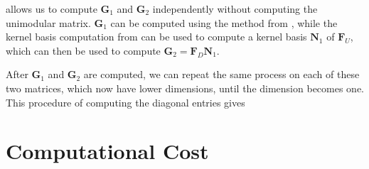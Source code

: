  allows us to compute $\mathbf{G}_{1}$
and $\mathbf{G}_{2}$ independently without computing the unimodular
matrix. $\mathbf{G}_{1}$ can be computed using the method from ,
while the kernel basis computation from 
can be used to compute a kernel basis $\mathbf{N}_{1}$ of $\mathbf{F}_{U}$,
which can then be used to compute $\mathbf{G}_{2}=\mathbf{F}_{D}\mathbf{N}_{1}$.

After $\mathbf{G}_{1}$ and $\mathbf{G}_{2}$ are computed, we can
repeat the same process on each of these two matrices, which now have
lower dimensions, until the dimension becomes one. This procedure
of computing the diagonal entries gives 




\section{Computational Cost}

